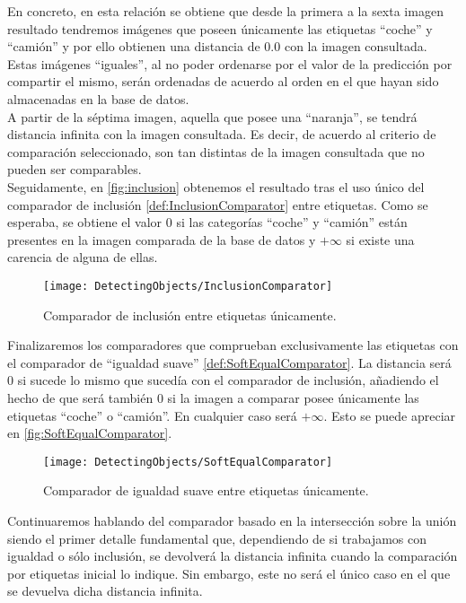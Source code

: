 En concreto, en esta relación se obtiene que desde la primera a la sexta imagen resultado tendremos imágenes que poseen únicamente las etiquetas ``coche'' y ``camión'' y por ello obtienen una distancia de $0.0$ con la imagen consultada. Estas imágenes ``iguales'', al no poder ordenarse por el valor de la predicción por compartir el mismo, serán ordenadas de acuerdo al orden en el que hayan sido almacenadas en la base de datos.\\

A partir de la séptima imagen, aquella que posee una ``naranja'', se tendrá distancia infinita con la imagen consultada. Es decir, de acuerdo al criterio de comparación seleccionado, son tan distintas de la imagen consultada que no pueden ser comparables.\\

Seguidamente, en \autoref{fig:inclusion} obtenemos el resultado tras el uso único del comparador de inclusión \autoref{def:InclusionComparator} entre etiquetas. Como se esperaba, se obtiene el valor $0$ si las categorías ``coche'' y ``camión'' están presentes en la imagen comparada de la base de datos y $+\infty$ si existe una carencia de alguna de ellas.\\

\begin{figure}[htpb]
  \centering
  \texttt{[image: DetectingObjects/InclusionComparator]}
  \caption{Comparador de inclusión entre etiquetas únicamente.}
  \label{fig:inclusion}
\end{figure}

Finalizaremos los comparadores que comprueban exclusivamente las etiquetas con el comparador de ``igualdad suave'' \autoref{def:SoftEqualComparator}. La distancia será $0$ si sucede lo mismo que sucedía con el comparador de inclusión, añadiendo el hecho de que será también $0$ si la imagen a comparar posee únicamente las etiquetas ``coche'' o ``camión''. En cualquier caso será $+\infty$. Esto se puede apreciar en \autoref{fig:SoftEqualComparator}.\\

\begin{figure}[htpb]
  \centering
  \texttt{[image: DetectingObjects/SoftEqualComparator]}
  \caption{Comparador de igualdad suave entre etiquetas únicamente.}
  \label{fig:SoftEqualComparator}
\end{figure}

\newpage
Continuaremos hablando del comparador basado en la intersección sobre la unión siendo el primer detalle fundamental que, dependiendo de si trabajamos con igualdad  o sólo inclusión, se devolverá la distancia infinita cuando la comparación por etiquetas inicial lo indique. Sin embargo, este no será el único caso en el que se devuelva dicha distancia infinita.\\

